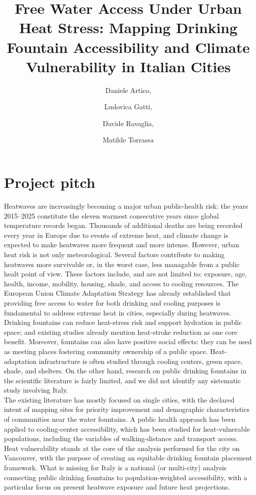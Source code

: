 \documentclass[a4paper,11pt]{article}
\title{Free Water Access Under Urban Heat Stress: Mapping Drinking Fountain Accessibility and Climate Vulnerability in Italian Cities}
\author[a]{Daniele Artico,}
\author{Ludovica Gatti,}
\author{Davide Ravaglia,}
\author{Matilde Torrassa}
\affiliation[a]{Dipartimento SMFI, Universit\`a di Parma, Viale G.P. Usberti 7/A, 43100, Parma, Italy and INFN
Gruppo Collegato di Parma}
\begin{document}
\maketitle
\noindent
\section{Project pitch}

Heatwaves are increasingly becoming a major urban public-health risk: the years 2015–2025 constitute the eleven warmest consecutive years since global temperature records began. 
Thousands of additional deaths are being recorded every year in Europe due to events of extreme heat, and climate change is expected to make heatwaves more frequent and more intense.
However, urban heat risk is not only meteorological. 
Several factors contribute to making heatwaves more survivable or, in the worst case, less managable from a public healt point of view.
These factors include, and are not limited to: exposure, age, health, income, mobility, housing, shade, and access to cooling resources.
The European Union Climate Adaptation Strategy has already established that providing free access to water for both drinking and cooling purposes is fundamental to address extreme heat in cities, especially during heatwaves.
Drinking fountains can reduce heat-stress risk and support hydration in public space; and existing studies already mention heat-stroke reduction as one core benefit.
Moreover, fountains can also have positive social effects: they can be used as meeting places fostering community ownership of a public space. Heat-adaptation infrastructure is often studied through cooling centers, green space, shade, and shelters.
On the other hand, research on public drinking fountains in the scientific literature is fairly limited, and we did not identify any sistematic study involving Italy.\\
 
The existing literature has mostly focused on single cities, with the declared intent of mapping sites for priority improvement and demographic characteristics of communities near the water fountains.
A public health approach has been applied to cooling-center accessibility, which has been studied for heat-vulnerable populations, including the variables of walking-distance and transport access. Heat vulnerability stands at the core of the analysis performed for the city on Vancouver, with the purpose of creating an equitable drinking fountain placement framework. 
What is missing for Italy is a national (or multi-city) analysis connecting public drinking fountains to population-weighted accessibility, with a particular focus on present heatwave exposure and future heat projections.\\
\end{document}
